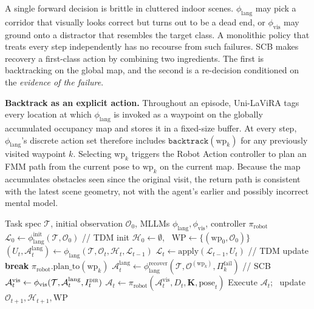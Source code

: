 \documentclass[conference]{IEEEtran}
\newcommand{\ourmethod}{Uni-LaViRA\xspace}
\begin{document}
A single forward decision is brittle in cluttered indoor scenes.
$\phi_{\mathrm{lang}}$ may pick a corridor that visually looks correct but
turns out to be a dead end, or $\phi_{\mathrm{vis}}$ may ground onto a
distractor that resembles the target class. A monolithic policy that treats
every step independently has no recourse from such failures. SCB makes
recovery a first-class action by combining two ingredients. The first is
backtracking on the global map, and the second is a re-decision conditioned on
the \emph{evidence of the failure}.

\textbf{Backtrack as an explicit action.} Throughout an episode, \ourmethod
tags every location at which $\phi_{\mathrm{lang}}$ is invoked as a waypoint
on the globally accumulated occupancy map and stores it in a fixed-size
buffer. At every step, $\phi_{\mathrm{lang}}$'s discrete action set therefore
includes $\texttt{backtrack}(\mathrm{wp}_k)$ for any previously visited
waypoint $k$. Selecting $\mathrm{wp}_k$ triggers the Robot Action controller
to plan an FMM path from the current pose to $\mathrm{wp}_k$ on the current
map. Because the map accumulates obstacles seen since the original visit, the
return path is consistent with the latest scene geometry, not with the agent's
earlier and possibly incorrect mental model.

\begin{algorithm}[!t]
\caption{One episode of \ourmethod.}
\label{alg:main_loop}
\begin{algorithmic}[1]
\REQUIRE Task spec $\mathcal{T}$, initial observation $\mathcal{O}_0$, MLLMs
$\phi_{\mathrm{lang}},\phi_{\mathrm{vis}}$, controller $\pi_{\mathrm{robot}}$
\STATE $\mathcal{L}_0 \leftarrow
\phi_{\mathrm{lang}}^{\mathrm{init}}(\mathcal{T},\mathcal{O}_0)$ \hfill // TDM
init
\STATE $\mathcal{H}_0 \leftarrow \emptyset$,~ $\mathrm{WP} \leftarrow
\{(\mathrm{wp}_0,\mathcal{O}_0)\}$
  \STATE $(U_t,\mathcal{A}^{\mathrm{lang}}_t) \leftarrow
  \phi_{\mathrm{lang}}(\mathcal{T},\mathcal{O}_t,\mathcal{H}_t,\mathcal{L}_{t-1})$
  \STATE $\mathcal{L}_t \leftarrow \mathrm{apply}(\mathcal{L}_{t-1},U_t)$
  \hfill // TDM update
    \STATE \textbf{break}
    \STATE $\pi_{\mathrm{robot}}.\mathrm{plan\_to}(\mathrm{wp}_k)$
    \STATE $\mathcal{A}^{\mathrm{lang}}_t \leftarrow
    \phi_{\mathrm{lang}}^{\mathrm{recover}}(\mathcal{T},\mathcal{O}^{(\mathrm{wp}_k)},\Pi_k^{\mathrm{fail}})$
    \hfill // SCB
  \ENDIF
  \STATE $\mathcal{A}^{\mathrm{vis}}_t \leftarrow
  \phi_{\mathrm{vis}}(\mathcal{T},\mathcal{A}^{\mathrm{lang}}_t,I^{\textsc{dir}}_t)$
  \STATE $\mathcal{A}_t \leftarrow
  \pi_{\mathrm{robot}}(\mathcal{A}^{\mathrm{vis}}_t,D_t,\mathbf{K},\mathrm{pose}_t)$
  \STATE Execute $\mathcal{A}_t$;~ update
  $\mathcal{O}_{t+1},\mathcal{H}_{t+1},\mathrm{WP}$
\ENDFOR
\end{algorithmic}
\end{algorithm}
\end{document}
